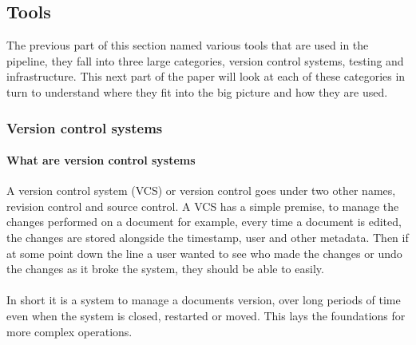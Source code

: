 \subsection{Tools}

The previous part of this section named various tools that are used in the pipeline, they fall into three large categories, version control systems, testing  and infrastructure. This next part of the paper will look at each of these categories in turn to understand where they fit into the big picture and how they are used.

\subsubsection{Version control systems}

\paragraph{What are version control systems}
A version control system (VCS) or version control goes under two other names, revision control and source control. A VCS has a simple premise, to manage the changes performed on a document for example, every time a document is edited, the changes are stored alongside the timestamp, user and other metadata. Then if at some point down the line a user wanted to see who made the changes or undo the changes as it broke the system, they should be able to easily. 
\\\\
In short it is a system to manage a documents version, over long periods of time even when the system is closed, restarted or moved. This lays the foundations for more complex operations. 

